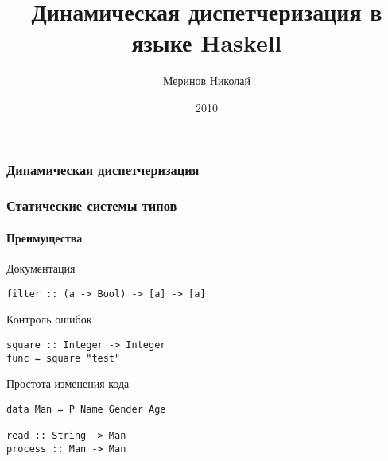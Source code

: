 \documentclass[ucs]{beamer}
\title[Динамическая диспетчеризация]{Динамическая диспетчеризация в языке Haskell}
\author{Меринов Николай}
\institute{УрГУ}
\date{2010}
\begin{document}

\begin{frame}
\titlepage
\end{frame}

\begin{frame}[fragile]
  \frametitle{Динамическая диспетчеризация}
  \framesubtitle{}
\end{frame}

\begin{frame}[fragile]
  \frametitle{Статические системы типов}
  \framesubtitle{Преимущества}
  \begin{block}{Документация}
\begin{verbatim}
filter :: (a -> Bool) -> [a] -> [a]
\end{verbatim}
  \end{block}

  \begin{block}{Контроль ошибок}
\begin{verbatim}
square :: Integer -> Integer
func = square "test"
\end{verbatim}
  \end{block}

  \begin{block}{Простота изменения кода}
\begin{verbatim}
data Man = P Name Gender Age

read :: String -> Man
process :: Man -> Man
\end{verbatim}
  \end{block}
\end{frame}

\end{document}
